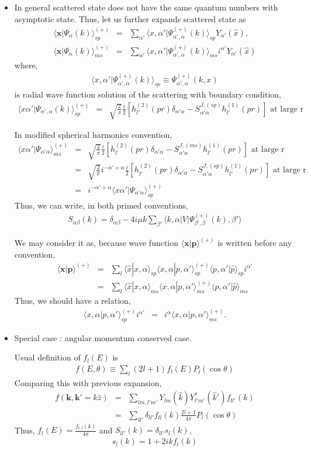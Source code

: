 \documentclass[10pt]{article}
\def\bm{\boldsymbol}
\newcommand{\bea}{\begin{eqnarray}}
\newcommand{\eea}{\end{eqnarray}}
\newcommand{\no}{\nonumber \\}
\def\vp{{\bm p}}
\def\vk{{\bm k}}
\def\vx{{\bm x}}
\def\la{\langle}
\def\ra{\rangle}
\begin{document}
\begin{itemize}
\item In general scattered state does not have the same
quantum numbers with asymptotic state.
Thus, let us further expands scattered state as
\bea
\la \vx |\Psi_\alpha(k)\ra^{(+)}_{sp}
&=&\sum_{\alpha'} 
\la x,\alpha'|\Psi^{(+)}_{\alpha',\alpha}(k)\ra_{sp}
Y_{\alpha'}(\hat{x}),\no
\la \vx |\Psi_\alpha(k)\ra^{(+)}_{ms}
&=&\sum_{\alpha'} 
\la x,\alpha'|\Psi^{(+)}_{\alpha',\alpha}(k)\ra_{ms}
i^{\alpha'}Y_{\alpha'}(\hat{x})
\eea
where,
\bea
\la x,\alpha'|\Psi^{(+)}_{\alpha',\alpha}(k)\ra_{sp}
\equiv \Psi^{(+)}_{\alpha',\alpha}(k,x)
\eea
is radial wave function solution 
of the scattering with 
boundary condition,
\bea
\la x \alpha'|\Psi_{\alpha',\alpha}(k)\ra^{(+)}_{sp}
&=&\sqrt{\frac{2}{\pi}}\frac{i}{2}
                  [h^{(2)}_{l'}(pr)\delta_{\alpha'\alpha}
                      -S^{J,(sp)}_{\alpha'\alpha} 
                      h^{(1)}_{l'}(pr)] 
                      \mbox{ at large r}
\eea

In modified spherical harmonics convention,
\bea
\la x \alpha'|\Psi_{\alpha'\alpha}\ra^{(+)}_{ms}
&=&\sqrt{\frac{2}{\pi}}
    \frac{i}{2}[h^{(2)}_{l'}(pr)\delta_{\alpha'\alpha}
                      -S^{J,(ms)}_{\alpha'\alpha} 
                      h^{(1)}_{l'}(pr)] 
                      \mbox{ at large r}\no
&=&\sqrt{\frac{2}{\pi}}
   i^{-\alpha'+\alpha} \frac{i}{2}
                  [h^{(2)}_{l'}(pr)\delta_{\alpha'\alpha}
                      -S^{J,(sp)}_{\alpha'\alpha} 
                      h^{(1)}_{l'}(pr)] 
                      \mbox{ at large r}\no
&=&i^{-\alpha'+\alpha}\la x \alpha'|\Psi_{\alpha'\alpha}\ra^{(+)}_{sp}
\eea
Thus, we can write, in both primed conventions,
\bea
S_{\alpha\beta}(k)=\delta_{\alpha\beta}-4i\mu k
 \sum_{\beta'}\la k, \alpha|V|\Psi^{(+)}_{\beta',\beta}(k),\beta'\ra
\eea

We may consider it as, because wave function 
$\la\vx|\vp\ra^{(+)}$ is written before any convention,
\bea
\la \vx|\vp\ra^{(+)}&=&\sum_{l}\la \hat{x}|x,\alpha\ra_{sp}
                     \la x,\alpha|p,\alpha'\ra^{(+)}_{sp}
                     \la p,\alpha'|\hat{p}\ra_{sp} i^{\alpha'}\no
                    &=&\sum_{l}\la \hat{x}|x,\alpha\ra_{ms}
                     \la x,\alpha|p,\alpha'\ra^{(+)}_{ms}
                     \la p,\alpha'|\hat{p}\ra_{ms}  
\eea
Thus, we should have a relation,
\bea
\la x,\alpha|p,\alpha'\ra^{(+)}_{sp}i^{\alpha'}
&=& i^{\alpha}\la x,\alpha|p,\alpha'\ra^{(+)}_{ms}.
\eea

\item Special case : angular momentum conserved case.

Usual definition of $f_l(E)$ is
\bea
f(E,\theta)\equiv\sum_{l}(2l+1)f_l(E)P_l(\cos\theta)
\eea
Comparing this with previous expansion,
\bea
f(\vk,\vk'=k \hat{z}) &=&\sum_{lm, l' m'} 
         Y_{lm}(\hat{k})Y^*_{l'm'}(\hat{k}')
         f_{l l'}(k)\no
    &=&\sum_{ll'} \delta_{ll'} f_{ll}(k)
           \frac{2l+1}{4\pi}P_l(\cos\theta)
\eea
Thus, $f_l(E)=\frac{f_{l,l}(k)}{4\pi}$ and $S_{ll'}(k)=\delta_{ll'}s_l(k)$,
\bea
s_l(k)=1+2ik f_l(k)
\eea

\end{itemize}
\end{document}
